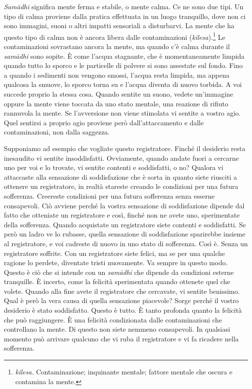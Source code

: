 \emph{Samādhi} significa mente ferma e stabile, o mente calma. Ce ne
sono due tipi. Un tipo di calma proviene dalla pratica effettuata in un
luogo tranquillo, dove non ci sono immagini, suoni o altri impatti
sensoriali a disturbarvi. La mente che ha questo tipo di calma non è
ancora libera dalle contaminazioni (\emph{kilesa}).\footnote{\emph{kilesa.}
  Contaminazione; inquinante mentale; fattore mentale che oscura e
  contamina la mente.} Le contaminazioni sovrastano ancora la mente, ma
quando c'è calma durante il \emph{samādhi} sono sopite. È come l'acqua
stagnante, che è momentaneamente limpida quando tutto lo sporco e le
particelle di polvere si sono assestate sul fondo. Fino a quando i
sedimenti non vengono smossi, l'acqua resta limpida, ma appena qualcosa
la smuove, lo sporco torna su e l'acqua diventa di nuovo torbida. A voi
succede proprio la stessa cosa. Quando sentite un suono, vedete
un'immagine oppure la mente viene toccata da uno stato mentale, una
reazione di rifiuto rannuvola la mente. Se l'avversione non viene
stimolata vi sentite a vostro agio. Quel sentirsi a proprio agio
proviene però dall'attaccamento e dalle contaminazioni, non dalla
saggezza.

Supponiamo ad esempio che vogliate questo registratore. Finché il
desiderio resta inesaudito vi sentite insoddisfatti. Ovviamente, quando
andate fuori a cercarne uno per voi e lo trovate, vi sentite contenti e
soddisfatti, o no? Qualora vi attaccaste alla sensazione di
soddisfazione che è sorta in quanto siete riusciti a ottenere un
registratore, in realtà stareste creando le condizioni per una futura
sofferenza. Creereste condizioni per una futura sofferenza senza esserne
consapevoli. Ciò avviene perché la vostra sensazione di soddisfazione
dipende dal fatto che otteniate un registratore e così, finché non ne
avete uno, sperimentate della sofferenza. Quando acquistate un
registratore siete contenti e soddisfatti. Se però un ladro ve lo
rubasse, quella sensazione di soddisfazione sparirebbe insieme al
registratore, e voi cadreste di nuovo in uno stato di sofferenza. Così
è. Senza un registratore soffrite. Con un registratore siete felici, ma
se per una qualche ragione lo perdete, diventate tristi nuovamente. Va
sempre in questo modo. Questo è ciò che si intende con un \emph{samādhi}
che dipende da condizioni esterne tranquille. È incerto, come la
felicità sperimentata quando ottenete quel che volete. Quando alla fine
avete il registratore che cercavate, vi sentite benissimo. Qual è però
la vera causa di quella sensazione piacevole? Sorge perché il vostro
desiderio è stato soddisfatto. Questo è tutto. È tanto profonda quanto
la felicità che può raggiungere. È una felicità condizionata dalle
contaminazioni che controllano la mente. Di questo non siete nemmeno
consapevoli. In qualsiasi momento può arrivare qualcuno che vi ruba il
registratore e vi fa ricadere nella sofferenza.

